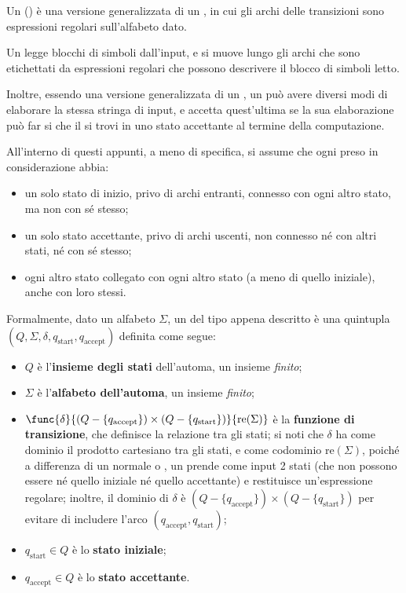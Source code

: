\documentclass[a4paper, 12pt]{report}
\begin{document}
    \begin{frameddefn}[label={def gnfa}]{\GNFA}
        Un \tbf{\GNFA} () è una versione generalizzata di un \NFA, in cui gli archi delle transizioni sono espressioni regolari sull'alfabeto dato.

        Un \GNFA legge blocchi di simboli dall'input, e si muove lungo gli archi che sono etichettati da espressioni regolari che possono descrivere il blocco di simboli letto.

        Inoltre, essendo una versione generalizzata di un \NFA, un \GNFA può avere diversi modi di elaborare la stessa stringa di input, e accetta quest'ultima se la sua elaborazione può far si che il \GNFA si trovi in uno stato accettante al termine della computazione.

         All'interno di questi appunti, a meno di specifica, si assume che ogni \GNFA preso in considerazione abbia:

        \begin{itemize}
            \item un solo stato di inizio, privo di archi entranti, connesso con ogni altro stato, ma non con sé stesso;
            \item un solo stato accettante, privo di archi uscenti, non connesso né con altri stati, né con sé stesso;
            \item ogni altro stato collegato con ogni altro stato (a meno di quello iniziale), anche con loro stessi.
        \end{itemize}

        Formalmente, dato un alfabeto $\Sigma$, un \GNFA del tipo appena descritto è una quintupla $(Q, \Sigma, \delta, q_{\mathrm{start}}, q_{\mathrm{accept}})$ definita come segue:

        \begin{itemize}
            \item $Q$ è l'\textbf{insieme degli stati} dell'automa, un insieme \textit{finito};
            \item $\Sigma$ è l'\textbf{alfabeto dell'automa}, un insieme \textit{finito};
            \item $\func{\delta}{(Q - \{q_{\mathrm{accept}}\}) \times (Q - \{q_{\mathrm{start}}\})}{\mathrm{re}(\Sigma)}$ è la \textbf{funzione di transizione}, che definisce la relazione tra gli stati; si noti che $\delta$ ha come dominio il prodotto cartesiano tra gli stati, e come codominio $\mathrm{re}(\Sigma)$, poiché a differenza di un normale \DFA o \NFA, un \GNFA prende come input 2 stati (che non possono essere né quello iniziale né quello accettante) e restituisce un'espressione regolare; inoltre, il dominio di $\delta$ è $(Q - \{q_{\mathrm{accept}}\}) \times (Q - \{q_{\mathrm{start}}\})$ per evitare di includere l'arco $(q_{\mathrm{accept}}, q_\mathrm{start})$;
            \item $q_\mathrm{start} \in Q$ è lo \textbf{stato iniziale};
            \item $q_\mathrm{accept} \in Q$ è lo \textbf{stato accettante}.
        \end{itemize}
    \end{frameddefn}
\end{document}
